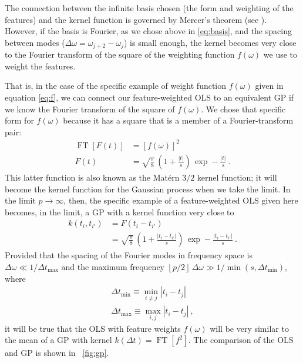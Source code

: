 \documentclass[12pt,letterpaper]{article}
\newcommand{\floor}[1]{\left\lfloor #1 \right\rfloor}
\DeclareMathOperator{\FT}{FT}
\begin{document}
The connection between the infinite basis chosen (the form and weighting of the features) and the kernel function is governed by Mercer's theorem (see \citealt{minh2006mercer}).
However, if the basis is Fourier, as we chose above in \eqref{eq:basis}, and the spacing between modes ($\Delta\omega =\omega_{j+2}-\omega_j$) is small enough, the kernel becomes very close to the Fourier transform of the square of the weighting function $f(\omega)$ we use to weight the features.

That is, in the case of the specific example of weight function $f(\omega)$ given in equation \eqref{eq:f}, we can connect our feature-weighted OLS to an equivalent GP if we know the Fourier transform of the square of $f(\omega)$. We chose that specific form for $f(\omega)$ because it has a square that is a member of a Fourier-transform pair:
\begin{align}
    \FT[F(t)] &= [f(\omega)]^2
    \\ \label{eq:F}
    F(t) &= \sqrt{\frac{\pi}{8}}\,\left(1 + \frac{|t|}{s}\right)\,\exp -\frac{|t|}{s}
    ~.
\end{align}
This latter function is also known as the Mat\'ern $3/2$ kernel function; it will become the kernel function for the Gaussian process when we take the limit.
In the limit $p\rightarrow\infty$, then, the specific example of a feature-weighted OLS given here becomes, in the limit, a GP with a kernel function very close to
\begin{align}
    k(t_i,t_{i'}) &= F(t_i-t_{i'})
    \\ \label{eq:k}
    &= \sqrt{\frac{\pi}{8}}\,\left(1 + \frac{|t_i - t_{i'}|}{s}\right)\,\exp -\frac{|t_i - t_{i'}|}{s}
    ~.
\end{align}
Provided that the spacing of the Fourier modes in frequency space is $\Delta\omega\ll 1 / \Delta t_{\max}$ and the maximum frequency $\floor{p / 2}\,\Delta\omega \gg 1 / \min(s, \Delta t_{\min})$, where
\begin{align}
    \Delta t_{\min} \equiv \min_{i\ne j}|t_i - t_j|
    \\
    \Delta t_{\max} \equiv \max_{i,j}|t_i - t_j|
    ~,
\end{align}
it will be true that the OLS with feature weights $f(\omega)$ will be very similar to the mean of a GP with kernel $k(\Delta t) = \FT[f^2]$.
The comparison of the OLS and GP is shown in \figurename~\ref{fig:gp}.
\end{document}

